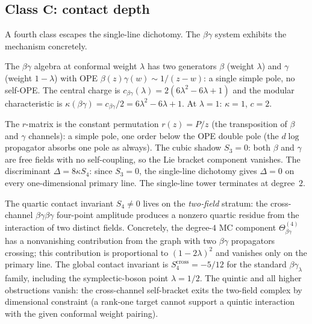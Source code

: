 \documentclass[11pt,reqno]{amsart}
\theoremstyle{definition}
\theoremstyle{remark}
\numberwithin{equation}{section}
\begin{document}
\subsection{Class $\mathbf{C}$: contact
depth}\label{subsec:class-C}

A fourth class escapes the single-line dichotomy. The
$\beta\gamma$ system exhibits the mechanism concretely.

The $\beta\gamma$ algebra at conformal weight $\lambda$ has
two generators $\beta$ (weight $\lambda$) and $\gamma$
(weight $1 - \lambda$) with OPE
$\beta(z)\gamma(w) \sim 1/(z-w)$: a single simple pole,
no self-OPE. The central charge is
$c_{\beta\gamma}(\lambda) = 2(6\lambda^2 - 6\lambda + 1)$
and the modular characteristic is
$\kappa(\beta\gamma) = c_{\beta\gamma}/2
= 6\lambda^2 - 6\lambda + 1$.
At $\lambda = 1$: $\kappa = 1$, $c = 2$.

The $r$-matrix is the constant permutation
$r(z) = P/z$ (the transposition of $\beta$ and $\gamma$
channels): a simple pole, one order below the OPE double pole
(the $d\log$ propagator absorbs one pole as always). The
cubic shadow $S_3 = 0$: both $\beta$ and $\gamma$ are
free fields with no self-coupling, so the Lie bracket
component vanishes. The discriminant
$\Delta = 8\kappa S_4$: since $S_3 = 0$, the single-line
dichotomy gives $\Delta = 0$ on every one-dimensional
primary line. The single-line tower terminates at degree~$2$.

The quartic contact invariant $S_4 \ne 0$ lives on the
\emph{two-field} stratum: the cross-channel
$\beta\gamma\beta\gamma$ four-point amplitude produces a
nonzero quartic residue from the interaction of two distinct
fields. Concretely, the degree-$4$ MC component
$\Theta^{(4)}_{\beta\gamma}$ has a nonvanishing contribution
from the graph with two $\beta\gamma$ propagators crossing;
this contribution is proportional to $(1 - 2\lambda)^2$ and
vanishes only on the primary line. The global contact invariant is
$S_4^{\mathrm{cross}}=-5/12$ for the standard
$\beta\gamma_\lambda$ family, including the symplectic-boson point
$\lambda=1/2$. The
quintic and all higher obstructions vanish: the cross-channel
self-bracket exits the two-field complex by dimensional
constraint (a rank-one target cannot support a quintic
interaction with the given conformal weight pairing).
\end{document}
